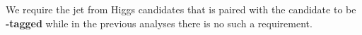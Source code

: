 We require the jet from Higgs candidates that is paired with the \PW candidate to be \textbf{\Pqb-tagged} while in the previous analyses there is no such a requirement.
